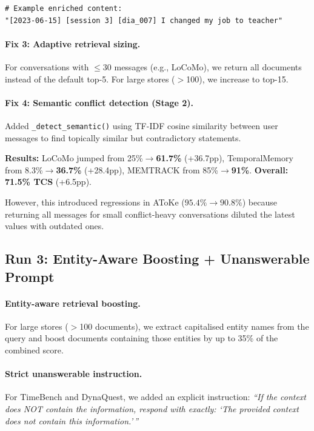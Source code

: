 \documentclass[11pt,a4paper]{article}
\begin{document}
\begin{lstlisting}
# Example enriched content:
"[2023-06-15] [session 3] [dia_007] I changed my job to teacher"
\end{lstlisting}

\paragraph{Fix 3: Adaptive retrieval sizing.}
For conversations with $\leq 30$ messages (e.g., LoCoMo), we return all
documents instead of the default top-5.  For large stores ($>$100), we
increase to top-15.

\paragraph{Fix 4: Semantic conflict detection (Stage 2).}
Added \texttt{\_detect\_semantic()} using TF-IDF cosine similarity between
user messages to find topically similar but contradictory statements.

\textbf{Results:}
LoCoMo jumped from 25\%$\to$\textbf{61.7\%} (+36.7pp), TemporalMemory from
8.3\%$\to$\textbf{36.7\%} (+28.4pp), MEMTRACK from 85\%$\to$\textbf{91\%}.
\textbf{Overall: 71.5\% TCS} (+6.5pp).

However, this introduced regressions in AToKe ($95.4\% \to 90.8\%$) because
returning all messages for small conflict-heavy conversations diluted the
latest values with outdated ones.


\subsection{Run 3: Entity-Aware Boosting + Unanswerable Prompt}

\paragraph{Entity-aware retrieval boosting.}
For large stores ($>$100 documents), we extract capitalised entity names
from the query and boost documents containing those entities by up to 35\%
of the combined score.

\paragraph{Strict unanswerable instruction.}
For TimeBench and DynaQuest, we added an explicit instruction:
\emph{``If the context does NOT contain the information, respond with exactly:
`The provided context does not contain this information.'\,''}
\end{document}
